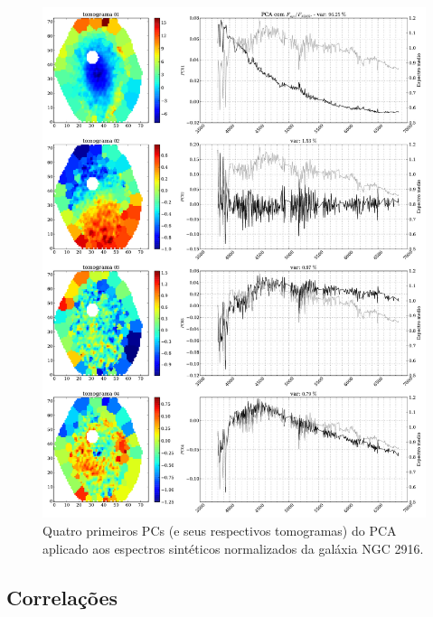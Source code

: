 \begin{figure}
    \includegraphics[width=1.\textwidth]{figuras/K0277-tomo1a4-syn-norm.pdf}
    \caption[Tomogramas de 1 a 4 da gal\'axia NGC 2916 - $F_{syn} / F_{\lambda 5365}$ .]
    {Quatro primeiros PCs (e seus respectivos tomogramas) do PCA aplicado aos espectros sintéticos normalizados da
    galáxia NGC 2916.}
    \label{fig:UsoPCA:K277tomofsynnorm}
\end{figure}

\subsection{Correla\c{c}\~oes}

